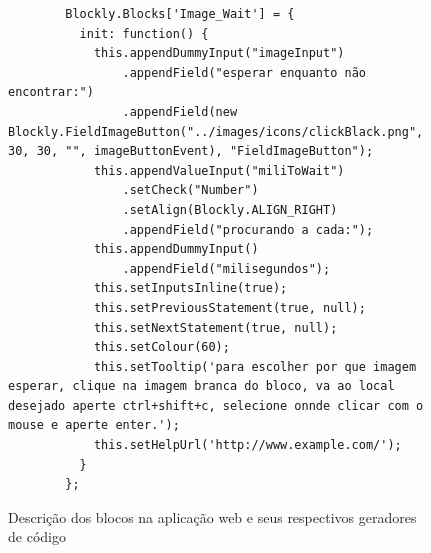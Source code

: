 \documentclass[tg]{mdtufsm}
\begin{document}
\begin{figure}[!htb]
\begin{lstlisting}
        Blockly.Blocks['Image_Wait'] = {
          init: function() {
            this.appendDummyInput("imageInput")
                .appendField("esperar enquanto não encontrar:")
                .appendField(new Blockly.FieldImageButton("../images/icons/clickBlack.png", 30, 30, "", imageButtonEvent), "FieldImageButton");
            this.appendValueInput("miliToWait")
                .setCheck("Number")
                .setAlign(Blockly.ALIGN_RIGHT)
                .appendField("procurando a cada:");
            this.appendDummyInput()
                .appendField("milisegundos");
            this.setInputsInline(true);
            this.setPreviousStatement(true, null);
            this.setNextStatement(true, null);
            this.setColour(60);
            this.setTooltip('para escolher por que imagem esperar, clique na imagem branca do bloco, va ao local desejado aperte ctrl+shift+c, selecione onnde clicar com o mouse e aperte enter.');
            this.setHelpUrl('http://www.example.com/');
          }
        };
    \end{lstlisting}
        \caption{Descrição dos blocos na aplicação web e seus respectivos geradores de código}
        \label{code:myBlocks.js}
    \end{figure}
\end{document}
